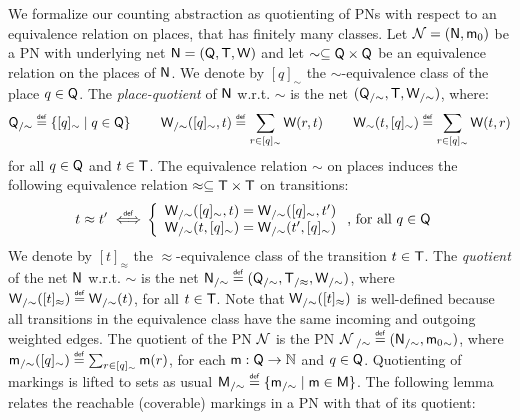 \ifLongVersion\else
\begin{textAtEnd}[category=quotients]
\fi

We formalize our counting abstraction as quotienting of PNs with
respect to an equivalence relation on places, that has finitely many
classes. Let $\mathcal{N} = (\mathsf{N},\mathsf{m}_0)$ be a PN with underlying
net $\mathsf{N} = (\mathsf{Q},\mathsf{T},\mathsf{W})$ and let $\sim \subseteq \mathsf{Q}
\times \mathsf{Q}$ be an equivalence relation on the places of
$\mathsf{N}$. We denote by $[q]_\sim$ the $\sim$-equivalence class of the
place $q \in \mathsf{Q}$. The \emph{place-quotient} of $\mathsf{N}$
w.r.t. $\sim$ is the net $(\mathsf{Q}_{/\sim}, \mathsf{T}, \mathsf{W}_{/\sim})$,
where:
\begin{align*}
\mathsf{Q}_{/\sim} \stackrel{\scriptscriptstyle{\mathsf{def}}}{=} {\{ {[q]_\sim \mid q \in \mathsf{Q}} \}} \hspace*{8mm}
\mathsf{W}_{/\sim}([q]_\sim,t) \stackrel{\scriptscriptstyle{\mathsf{def}}}{=} \sum_{r \in [q]_\sim} \mathsf{W}(r,t) \hspace*{8mm}
\mathsf{W}_{\sim}(t,[q]_\sim) \stackrel{\scriptscriptstyle{\mathsf{def}}}{=} \sum_{r \in [q]_\sim} \mathsf{W}(t,r) 
\end{align*}
for all $q \in \mathsf{Q}$ and $t \in \mathsf{T}$. The equivalence relation
$\sim$ on places induces the following equivalence relation $\approx
\subseteq \mathsf{T} \times \mathsf{T}$ on transitions:
\begin{align}\label{eq:rel-trans}
  t \approx t' \stackrel{\scriptscriptstyle{\mathsf{def}}}{\iff} & \left\{\begin{array}{l}
    \mathsf{W}_{/\sim}([q]_\sim,t) = \mathsf{W}_{/\sim}([q]_\sim,t') \\
    \mathsf{W}_{/\sim}(t,[q]_\sim) = \mathsf{W}_{/\sim}(t',[q]_\sim) 
    \end{array}\right.
    \text{, for all } q \in \mathsf{Q} 
\end{align}
We denote by $[t]_\approx$ the $\approx$-equivalence class of the
transition $t \in \mathsf{T}$.  The \emph{quotient} of the net $\mathsf{N}$
w.r.t. $\sim$ is the net $\mathsf{N}_{/\sim} \stackrel{\scriptscriptstyle{\mathsf{def}}}{=}
({\mathsf{Q}}_{/\sim},{\mathsf{T}}_{/\approx},{\mathsf{W}}_{/\sim})$, where
${\mathsf{W}}_{/\sim}([t]_\approx) \stackrel{\scriptscriptstyle{\mathsf{def}}}{=} {\mathsf{W}}_{/\sim}(t)$, for all
$t \in \mathsf{T}$.  Note that ${\mathsf{W}}_{/\sim}([t]_\approx)$ is
well-defined because all transitions in the equivalence class have the
same incoming and outgoing weighted edges. The quotient of the PN
$\mathcal{N}$ is the PN ${\mathcal{N}}_{~/\sim} \stackrel{\scriptscriptstyle{\mathsf{def}}}{=}
({\mathsf{N}}_{/\sim},{\mathsf{m}_0}_{\sim}) $, where
${\mathsf{m}}_{/\sim}([q]_\sim) \stackrel{\scriptscriptstyle{\mathsf{def}}}{=} \sum_{r\in[q]_\sim} \mathsf{m}(r)$, for
each $\mathsf{m}:\mathsf{Q}\rightarrow\mathbb{N}$ and $q \in \mathsf{Q}$. Quotienting
of markings is lifted to sets as usual ${\mathsf{M}}_{/\sim} \stackrel{\scriptscriptstyle{\mathsf{def}}}{=}
{\{ {{\mathsf{m}}_{/\sim} \mid \mathsf{m} \in \mathsf{M}} \}}$.  The following lemma
relates the reachable (\resp coverable) markings in a PN with that of
its quotient:


\end{textAtEnd}
